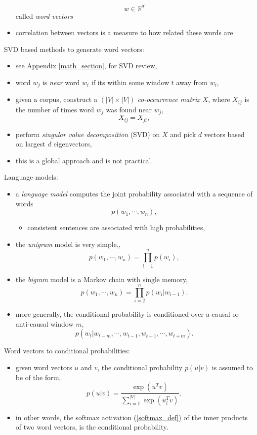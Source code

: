 \documentclass[onecolumn]{IEEEtran}
\newcommand{\beq}{\begin{equation}}
\newcommand{\eeq}{\end{equation}}
\newcommand{\bi}{\begin{itemize}}
\newcommand{\ei}{\end{itemize}}
\begin{document}
\begin{itemize}
        \beq
            w \in \mathbb{R}^d
        \eeq
        called \emph{word vectors}
        \item correlation between vectors is a measure to how related these words are
    \ei
    \item SVD based methods to generate word vectors:
    \bi
        \item see Appendix \ref{math_section}, for SVD review,
        \item word $w_j$ is \emph{near} word $w_i$ if its within some window $t$ away from  $w_i$,
        \item given a corpus, construct a $(|V|\times |V|)$ \emph{co-occurrence matrix} $X$, where $X_{ij}$ is the number of times word $w_j$ was found near $w_j$,
        \beq
            X_{ij} = X_{ji},
        \eeq
        \item perform \emph{singular value decomposition} (SVD) on $X$ and pick $d$ vectors based on largest $d$ eigenvectors,
        \item this is a global approach and is not practical.
    \ei
    \item Language models:
    \bi
        \item a \emph{language model} computes the joint probability associated with a sequence of words
        \beq
            p(w_1, \cdots, w_n),
        \eeq
        \bi
            \item consistent sentences are associated with high probabilities,
        \ei
        \item the \emph{unigram} model is very simple,,
        \beq\label{unigram_dist}
              p(w_1, \cdots, w_n) = \prod_{i=1}^{n} p(w_i),
        \eeq
        \item the \emph{bigram} model is a Markov chain with single memory,
         \beq
              p(w_1, \cdots, w_n) = \prod_{i=2}^{n} p(w_i|w_{i-1}).
        \eeq
        \item more generally, the conditional probability is conditioned over a causal or anti-causal window $m$,
        \beq\label{cp_window}
            p(w_t|w_{t-m},\cdots,w_{t-1},w_{t+1},\cdots,w_{t+m}).
        \eeq
    \ei
    \item Word vectors to conditional probabilities:
    \bi
        \item given word vectors $u$ and $v$, the conditional probability $p(u|v)$ is assumed to be of the form,
        \beq\label{cv2cp}
            p(u|v) = \frac{\exp (u^T v)}{\sum_{i=1}^{|V|} \exp (u_i^T v)},
        \eeq
        \item in other words, the softmax activation (\ref{softmax_def}) of the inner products of two word vectors, is the conditional probability.

\end{itemize}
\end{document}
